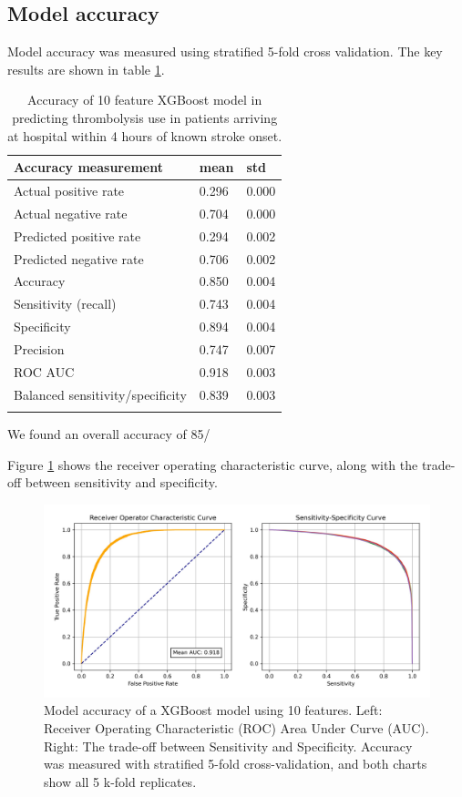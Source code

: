 
\subsection{Model accuracy}

Model accuracy was measured using stratified 5-fold cross validation. The key results are shown in table \ref{tab:accuracy_appendix}.

\begin{minipage}{\textwidth}
\begin{longtable}[]{@{}lll@{}}
\caption{Accuracy of 10 feature XGBoost model in predicting thrombolysis use in patients arriving at hospital within 4 hours of known stroke onset.}\\
\toprule
Accuracy measurement & mean & std\tabularnewline
\midrule
\endhead
Actual positive rate & 0.296 & 0.000\tabularnewline
Actual negative rate & 0.704 & 0.000\tabularnewline
Predicted positive rate & 0.294 & 0.002\tabularnewline
Predicted negative rate & 0.706 & 0.002\tabularnewline
Accuracy & 0.850 & 0.004\tabularnewline
Sensitivity (recall) & 0.743 & 0.004\tabularnewline
Specificity & 0.894 & 0.004\tabularnewline
Precision & 0.747 & 0.007\tabularnewline
ROC AUC & 0.918 & 0.003\tabularnewline
Balanced sensitivity/specificity & 0.839 & 0.003\tabularnewline
\bottomrule
\label{tab:accuracy_appendix}
\end{longtable}
\end{minipage}

We found an overall accuracy of 85/%

Figure \ref{fig:roc} shows the receiver operating characteristic curve, along with the trade-off between sensitivity and specificity.

\begin{figure}
\centering
\includegraphics[width=1\textwidth]{./images/02_xgb_10_features_roc_sens_spec}
\caption{Model accuracy of a XGBoost model using 10 features. Left: Receiver Operating Characteristic (ROC) Area Under Curve (AUC). Right: The trade-off between Sensitivity and Specificity. Accuracy was measured with stratified 5-fold cross-validation, and both charts show all 5 k-fold replicates.}
\label{fig:roc}
\end{figure}


